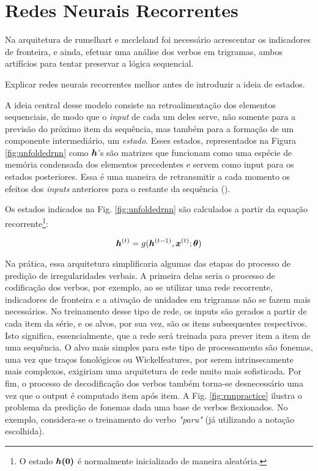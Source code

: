 \section{Redes Neurais Recorrentes}
\label{sec:RNN}

Na arquitetura de rumelhart e mccleland foi necessário acrescentar os indicadores de fronteira, e ainda, efetuar uma análise dos verbos em trigramas, ambos artifícios para tentar preservar a lógica sequencial.

Explicar redes neurais recorrentes melhor antes de introduzir a ideia de estados.


A ideia central desse modelo consiste na retroalimentação dos elementos sequenciais, de modo que o \textit{input} de cada um deles serve, não somente para a previsão do próximo item da sequência, mas também para a formação de um componente intermediário, um \textit{estado}. Esses estados, representados na Figura \ref{fig:unfoldedrnn} como $\bm{h}$'s são matrizes que funcionam como uma espécie de memória condensada dos elementos precedentes e servem como input para os estados posteriores. Essa é uma maneira de retransmitir a cada momento os efeitos dos \textit{inputs} anteriores para o restante da sequência (\cite{Goodfellow-et-al-2016}). 

%


Os estados indicados na Fig. \ref{fig:unfoldedrnn} são calculados a partir da equação recorrente\footnote{O estado $\bm{h(0)}$ é normalmente inicializado de maneira aleatória.}:

\begin{equation}
\bm{h}^{(t)} = g(\bm{h}^{(t-1)}, \bm{x}^{(t)}; \bm{\theta})
\label{eq:rnn}
\end{equation}

Na prática, essa arquitetura simplificaria algumas das etapas do processo de predição de irregularidades verbais. A primeira delas seria o processo de codificação dos verbos, por exemplo, ao se utilizar uma rede recorrente, indicadores de fronteira e a ativação de unidades em trigramas não se fazem mais necessários. No treinamento desse tipo de rede, os inputs são gerados a partir de cada item da série, e os alvos, por sua vez, são os itens subsequentes respectivos. Isto significa, essencialmente, que a rede será treinada para prever item a item de uma sequência. O alvo mais simples para este tipo de processamento são fonemas, uma vez que traços fonológicos ou Wickelfeatures, por serem intrinsecamente mais complexos, exigiriam uma arquitetura de rede muito mais sofisticada. Por fim, o processo de decodificação dos verbos também torna-se desnecessário uma vez que o output é computado item após item. A Fig. \ref{fig:rnnpractice} ilustra o problema da predição de fonemas dada uma base de verbos flexionados. No exemplo, considera-se o treinamento do verbo \textit{"paru"} (já utilizando a notação escolhida). %

